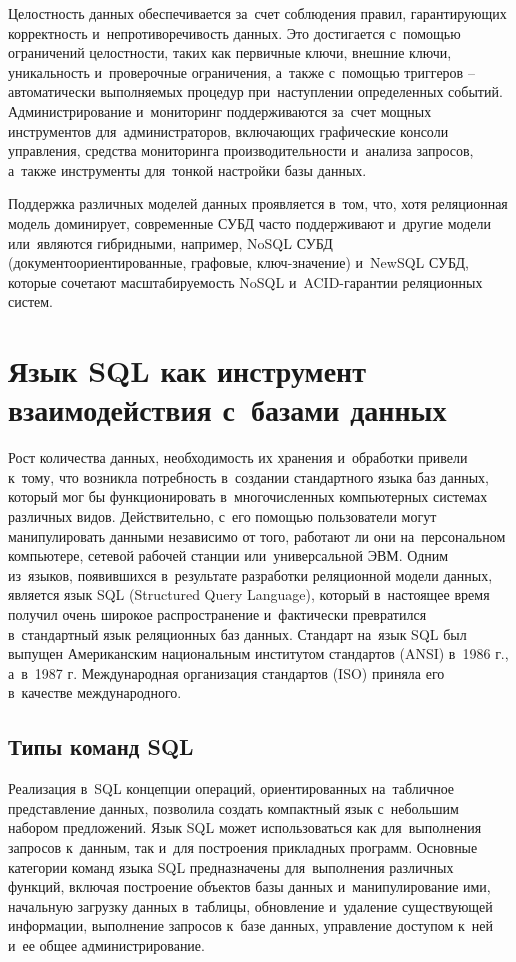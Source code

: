 \documentclass{ou}
\begin{document}
Целостность данных обеспечивается за~счет соблюдения правил, гарантирующих корректность и~непротиворечивость данных. Это достигается с~помощью ограничений целостности, таких как первичные ключи, внешние ключи, уникальность и~проверочные ограничения, а~также с~помощью триггеров -- автоматически выполняемых процедур при~наступлении определенных событий. Администрирование и~мониторинг поддерживаются за~счет мощных инструментов для~администраторов, включающих графические консоли управления, средства мониторинга производительности и~анализа запросов, а~также инструменты для~тонкой настройки базы данных.

Поддержка различных моделей данных проявляется в~том, что, хотя реляционная модель доминирует, современные СУБД часто поддерживают и~другие модели или~являются гибридными, например, NoSQL СУБД (документоориентированные, графовые, ключ-значение) и~NewSQL СУБД, которые сочетают масштабируемость NoSQL и~ACID-гарантии реляционных систем.
\newpage
\section{Язык SQL как инструмент взаимодействия с~базами данных}
Рост количества данных, необходимость их хранения и~обработки привели к~тому, что возникла потребность в~создании стандартного языка баз данных, который мог бы функционировать в~многочисленных компьютерных системах различных видов. Действительно, с~его помощью пользователи могут манипулировать данными независимо от того, работают ли они на~персональном компьютере, сетевой рабочей станции или~универсальной ЭВМ. Одним из~языков, появившихся в~результате разработки реляционной модели данных, является язык SQL (Structured Query Language), который в~настоящее время получил очень широкое распространение и~фактически превратился в~стандартный язык реляционных баз данных. Стандарт на~язык SQL был выпущен Американским национальным институтом стандартов (ANSI) в~1986 г., а~в~1987 г. Международная организация стандартов (ISO) приняла его в~качестве международного. 
\subsection{Типы команд SQL} 
Реализация в~SQL концепции операций, ориентированных на~табличное представление данных, позволила создать компактный язык с~небольшим набором предложений. Язык SQL может использоваться как для~выполнения запросов к~данным, так и~для построения прикладных программ. Основные категории команд языка SQL предназначены для~выполнения различных функций, включая построение объектов базы данных и~манипулирование ими, начальную загрузку данных в~таблицы, обновление и~удаление существующей информации, выполнение запросов к~базе данных, управление доступом к~ней и~ее общее администрирование. 
\end{document}
